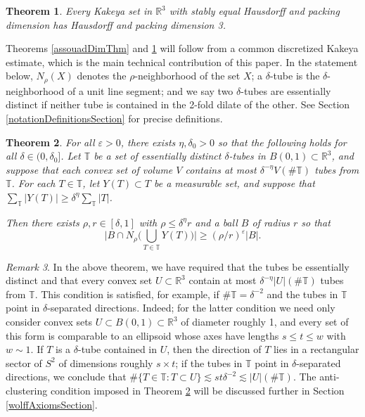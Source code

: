 \documentclass[letterpaper, reqno,11pt]{article}
\numberwithin{equation}{section}
\newcommand{\RR}{\mathbb{R}}
\newcommand{\eps}{\varepsilon}
\newcommand{\tubes}{\mathbb{T}}
\newtheorem{thm}{Theorem}
\numberwithin{thm}{section}
\theoremstyle{remark}
\newtheorem{rem}[thm]{Remark}
\begin{document}
\begin{thm}\label{equalHausdorffPackingKakeya}
Every Kakeya set in $\RR^3$ with stably equal Hausdorff and packing dimension has Hausdorff and packing dimension 3.
\end{thm}

Theorems \ref{assouadDimThm} and \ref{equalHausdorffPackingKakeya} will follow from a common discretized Kakeya estimate, which is the main technical contribution of this paper. In the statement below, $N_\rho(X)$ denotes the $\rho$-neighborhood of the set $X$; a $\delta$-tube is the $\delta$-neighborhood of a unit line segment; and we say two $\delta$-tubes are essentially distinct if neither tube is contained in the 2-fold dilate of the other. See Section \ref{notationDefinitionsSection} for precise definitions.
%
\begin{thm}\label{mainThmDiscretized}
For all $\eps>0$, there exists $\eta,\delta_0>0$ so that the following holds for all $\delta\in(0,\delta_0]$. Let $\tubes$ be a set of essentially distinct $\delta$-tubes in $B(0,1)\subset \RR^3$, and suppose that each convex set of volume $V$ contains at most $\delta^{-\eta}V(\#\tubes)$ tubes from $\tubes$. For each $T\in\tubes$, let $Y(T)\subset T$ be a measurable set, and suppose that $\sum_{\tubes}|Y(T)|\geq\delta^{\eta}\sum_{\tubes}|T|$. 

Then there exists $\rho,r\in [\delta,1]$ with $\rho\leq\delta^{\eta}r$ and a ball $B$ of radius $r$ so that
\begin{equation}\label{rhoRNbhdFullVol}
\Big| B \cap N_{\rho}\Big(\bigcup_{T\in\tubes}Y(T)\Big)\Big| \geq (\rho/r)^{\eps} |B|. 
\end{equation}
\end{thm}

\begin{rem}
In the above theorem, we have required that the tubes be essentially distinct and that every convex set $U\subset\RR^3$ contain at most $\delta^{-\eta}|U|(\#\tubes)$ tubes from $\tubes$. This condition is satisfied, for example, if $\#\tubes=\delta^{-2}$ and the tubes in $\tubes$ point in $\delta$-separated directions. Indeed; for the latter condition we need only consider convex sets $U\subset B(0,1)\subset\RR^3$ of diameter roughly 1, and every set of this form is comparable to an ellipsoid whose axes have lengths $s\leq t \leq w$ with $w\sim 1$. If $T$ is a $\delta$-tube contained in $U$, then the direction of $T$ lies in a rectangular sector of $S^2$ of dimensions roughly $s\times t$; if the tubes in $\tubes$ point in $\delta$-separated directions, we conclude that $\#\{T\in\tubes\colon T\subset U\}\lesssim st\delta^{-2}\lesssim |U|(\#\tubes)$. The anti-clustering condition imposed in Theorem \ref{mainThmDiscretized} will be discussed further in Section \ref{wolffAxiomsSection}.
\end{rem}
\end{document}
